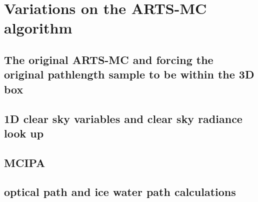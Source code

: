 \section{Variations on the ARTS-MC algorithm}
\subsection{The original ARTS-MC and forcing the original pathlength sample to be within the 3D box} 
\subsection{1D clear sky variables and clear sky radiance look up} 
\subsection{MCIPA}
\subsection{optical path and ice water path calculations}


